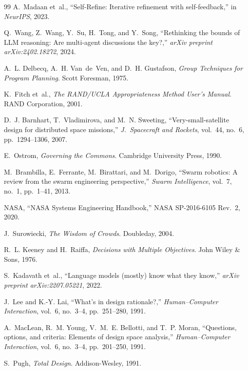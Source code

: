 \documentclass[11pt,a4paper]{article}
\begin{document}
\begin{thebibliography}{99}
A.~Madaan et~al., ``Self-Refine: Iterative refinement with self-feedback,'' in \emph{NeurIPS}, 2023.

Q.~Wang, Z.~Wang, Y.~Su, H.~Tong, and Y.~Song, ``Rethinking the bounds of LLM reasoning: Are multi-agent discussions the key?,'' \emph{arXiv preprint arXiv:2402.18272}, 2024.

A.~L. Delbecq, A.~H. Van~de~Ven, and D.~H. Gustafson, \emph{Group Techniques for Program Planning}. Scott Foresman, 1975.

K.~Fitch et~al., \emph{The RAND/UCLA Appropriateness Method User's Manual}. RAND Corporation, 2001.

D.~J. Barnhart, T.~Vladimirova, and M.~N. Sweeting, ``Very-small-satellite design for distributed space missions,'' \emph{J.\ Spacecraft and Rockets}, vol.~44, no.~6, pp.~1294--1306, 2007.

E.~Ostrom, \emph{Governing the Commons}. Cambridge University Press, 1990.

M.~Brambilla, E.~Ferrante, M.~Birattari, and M.~Dorigo, ``Swarm robotics: A review from the swarm engineering perspective,'' \emph{Swarm Intelligence}, vol.~7, no.~1, pp.~1--41, 2013.

NASA, ``NASA Systems Engineering Handbook,'' NASA SP-2016-6105 Rev.~2, 2020.

J.~Surowiecki, \emph{The Wisdom of Crowds}. Doubleday, 2004.

R.~L. Keeney and H.~Raiffa, \emph{Decisions with Multiple Objectives}. John Wiley \& Sons, 1976.

S.~Kadavath et~al., ``Language models (mostly) know what they know,'' \emph{arXiv preprint arXiv:2207.05221}, 2022.

J.~Lee and K.-Y. Lai, ``What's in design rationale?,'' \emph{Human--Computer Interaction}, vol.~6, no.~3--4, pp.~251--280, 1991.

A.~MacLean, R.~M. Young, V.~M.~E. Bellotti, and T.~P. Moran, ``Questions, options, and criteria: Elements of design space analysis,'' \emph{Human--Computer Interaction}, vol.~6, no.~3--4, pp.~201--250, 1991.

S.~Pugh, \emph{Total Design}. Addison-Wesley, 1991.


\end{thebibliography}
\end{document}
